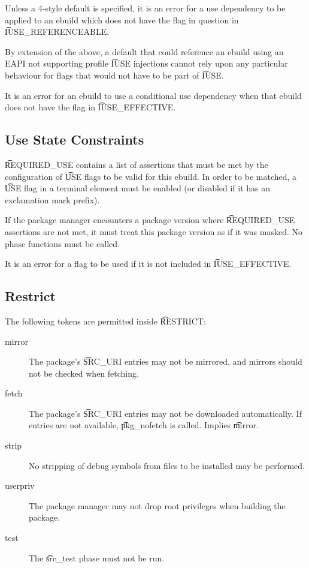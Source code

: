 Unless a 4-style default is specified, it is an error for a use dependency to be applied to an
ebuild which does not have the flag in question in \t{IUSE\_REFERENCEABLE}.

\note By extension of the above, a default that could reference an ebuild using an EAPI not
supporting profile \t{IUSE} injections cannot rely upon any particular behaviour for flags that
would not have to be part of \t{IUSE}.

It is an error for an ebuild to use a conditional use dependency when that ebuild does not have the
flag in \t{IUSE\_EFFECTIVE}.

\subsection{Use State Constraints}
\label{sec:required-use}
\t{REQUIRED\_USE} contains a list of assertions that must be met by the configuration of \t{USE}
flags to be valid for this ebuild. In order to be matched, a \t{USE} flag in a terminal element
must be enabled (or disabled if it has an exclamation mark prefix).

If the package manager encounters a package version where \t{REQUIRED\_USE} assertions are not met,
it must treat this package version as if it was masked. No phase functions must be called.

It is an error for a flag to be used if it is not included in \t{IUSE\_EFFECTIVE}.

\subsection{Restrict}
\label{sec:restrict}

The following tokens are permitted inside \t{RESTRICT}:

\begin{description}
\item[mirror] The package's \t{SRC\_URI} entries may not be mirrored, and mirrors should not
    be checked when fetching.
\item[fetch] The package's \t{SRC\_URI} entries may not be downloaded automatically. If
    entries are not available, \t{pkg\_nofetch} is called. Implies \t{mirror}.
\item[strip] No stripping of debug symbols from files to be installed may be performed.
\item[userpriv] The package manager may not drop root privileges when building the package.
\item[test] The \t{src\_test} phase must not be run.
\end{description}

